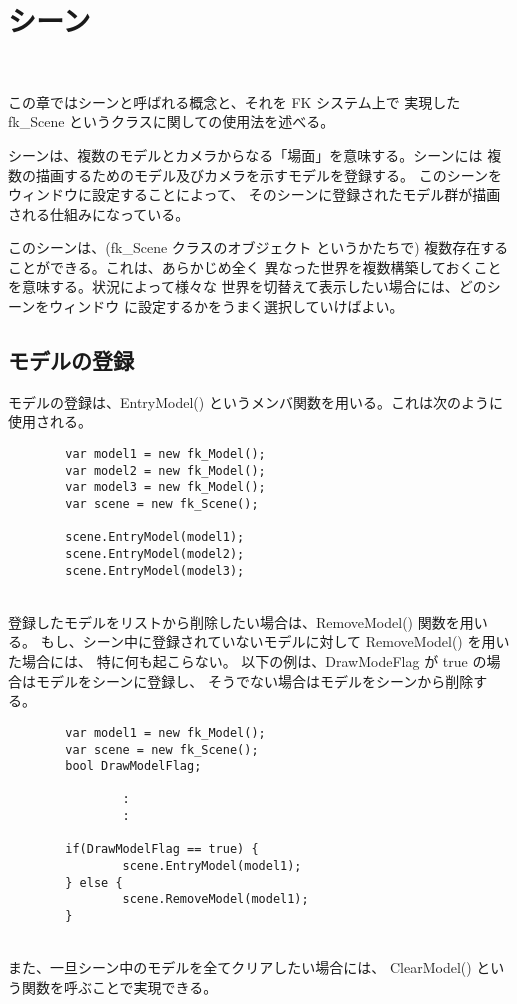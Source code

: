 \chapter{シーン} \label{chap:scene} ~

この章ではシーンと呼ばれる概念と、それを FK システム上で
実現した fk\_Scene というクラスに関しての使用法を述べる。

シーンは、複数のモデルとカメラからなる「場面」を意味する。シーンには
複数の描画するためのモデル及びカメラを示すモデルを登録する。
このシーンをウィンドウに設定することによって、
そのシーンに登録されたモデル群が描画される仕組みになっている。

このシーンは、(fk\_Scene クラスのオブジェクト
というかたちで) 複数存在することができる。これは、あらかじめ全く
異なった世界を複数構築しておくことを意味する。状況によって様々な
世界を切替えて表示したい場合には、どのシーンをウィンドウ
に設定するかをうまく選択していけばよい。

\section{モデルの登録}
モデルの登録は、EntryModel() というメンバ関数を用いる。これは次のように
使用される。
\\
\begin{breakbox}
\begin{verbatim}
        var model1 = new fk_Model();
        var model2 = new fk_Model();
        var model3 = new fk_Model();
        var scene = new fk_Scene();

        scene.EntryModel(model1);
        scene.EntryModel(model2);
        scene.EntryModel(model3);
\end{verbatim}
\end{breakbox}
~ \\
登録したモデルをリストから削除したい場合は、RemoveModel() 関数を用いる。
もし、シーン中に登録されていないモデルに対して RemoveModel() を用いた場合には、
特に何も起こらない。
以下の例は、DrawModeFlag が true の場合はモデルをシーンに登録し、
そうでない場合はモデルをシーンから削除する。
\\
\begin{breakbox}
\begin{verbatim}
        var model1 = new fk_Model();
        var scene = new fk_Scene();
        bool DrawModelFlag;

                :
                :

        if(DrawModelFlag == true) {
                scene.EntryModel(model1);
        } else {
                scene.RemoveModel(model1);
        }
\end{verbatim}
\end{breakbox}
~ \\
また、一旦シーン中のモデルを全てクリアしたい場合には、
ClearModel() という関数を呼ぶことで実現できる。

